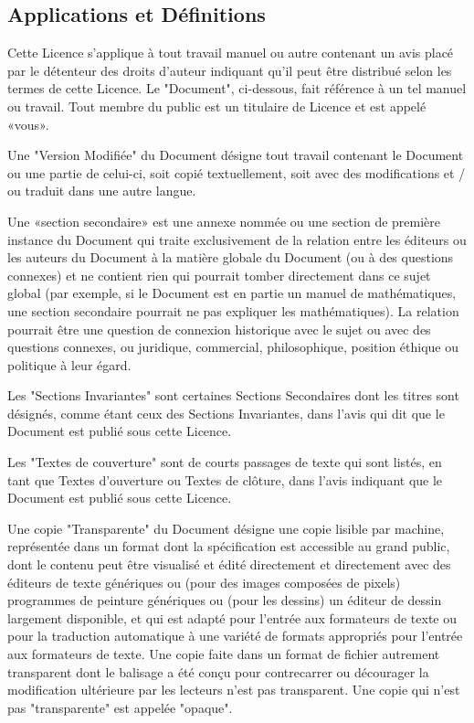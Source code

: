 	\subsection{Applications et Définitions}
	Cette Licence s'applique à tout travail manuel ou autre contenant un avis placé par le détenteur des droits d'auteur indiquant qu'il peut être distribué selon les termes de cette Licence. Le "Document", ci-dessous, fait référence à un tel manuel ou travail. Tout membre du public est un titulaire de Licence et est appelé «vous».

	Une "Version Modifiée" du Document désigne tout travail contenant le Document ou une partie de celui-ci, soit copié textuellement, soit avec des modifications et / ou traduit dans une autre langue.

	Une «section secondaire» est une annexe nommée ou une section de première instance du Document qui traite exclusivement de la relation entre les éditeurs ou les auteurs du Document à la matière globale du Document (ou à des questions connexes) et ne contient rien qui pourrait tomber directement dans ce sujet global (par exemple, si le Document est en partie un manuel de mathématiques, une section secondaire pourrait ne pas expliquer les mathématiques). La relation pourrait être une question de connexion historique avec le sujet ou avec des questions connexes, ou juridique, commercial, philosophique, position éthique ou politique à leur égard.
	
	Les "Sections Invariantes" sont certaines Sections Secondaires dont les titres sont désignés, comme étant ceux des Sections Invariantes, dans l'avis qui dit que le Document est publié sous cette Licence.

	Les "Textes de couverture" sont de courts passages de texte qui sont listés, en tant que Textes d'ouverture ou Textes de clôture, dans l'avis indiquant que le Document est publié sous cette Licence.

	Une copie "Transparente" du Document désigne une copie lisible par machine, représentée dans un format dont la spécification est accessible au grand public, dont le contenu peut être visualisé et édité directement et directement avec des éditeurs de texte génériques ou (pour des images composées de pixels) programmes de peinture génériques ou (pour les dessins) un éditeur de dessin largement disponible, et qui est adapté pour l'entrée aux formateurs de texte ou pour la traduction automatique à une variété de formats appropriés pour l'entrée aux formateurs de texte. Une copie faite dans un format de fichier autrement transparent dont le balisage a été conçu pour contrecarrer ou décourager la modification ultérieure par les lecteurs n'est pas transparent. Une copie qui n'est pas "transparente" est appelée "opaque".

